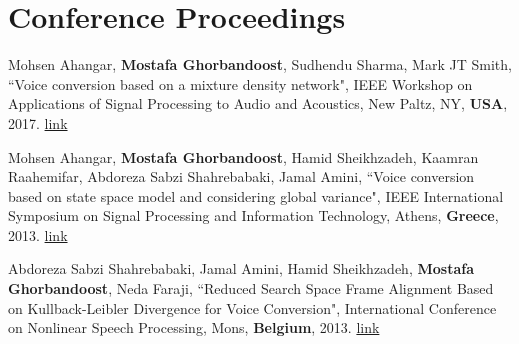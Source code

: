 \documentclass[letterpaper,11pt]{article}
\begin{document}
\section{Conference Proceedings}
\begin{enumerate}[noitemsep, leftmargin=*,label={[\arabic*]}]
\item{Mohsen Ahangar, \textbf{Mostafa Ghorbandoost}, Sudhendu Sharma, Mark JT Smith, ``Voice conversion based on a mixture density network", IEEE Workshop on Applications of Signal Processing to Audio and Acoustics, New Paltz, NY, \textbf{USA}, 2017. \href{https://ieeexplore.ieee.org/document/8170049}{link}}
\vspace{5pt}
\item{Mohsen Ahangar, \textbf{Mostafa Ghorbandoost}, Hamid Sheikhzadeh, Kaamran Raahemifar, Abdoreza Sabzi Shahrebabaki, Jamal Amini, ``Voice conversion based on state space model and considering global variance", IEEE International Symposium on Signal Processing and Information Technology, Athens, \textbf{Greece}, 2013. \href{https://ieeexplore.ieee.org/document/6781917}{link}}
\vspace{-7pt}
\item{Abdoreza Sabzi Shahrebabaki, Jamal Amini, Hamid Sheikhzadeh, \textbf{Mostafa Ghorbandoost}, Neda Faraji, ``Reduced Search Space Frame Alignment Based on Kullback-Leibler Divergence for Voice Conversion", International Conference on Nonlinear Speech Processing, Mons, \textbf{Belgium}, 2013. \href{https://link.springer.com/chapter/10.1007/978-3-642-38847-7_11}{link}}
\end{enumerate}
\end{document}
